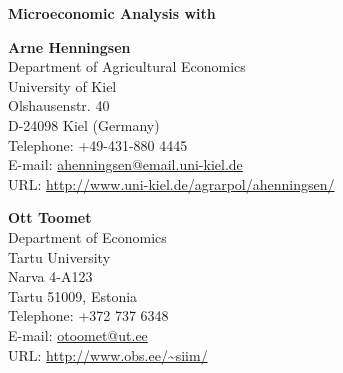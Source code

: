 \documentclass[12pt,english]{article}
\begin{document}
\begin{center}
\vspace*{2cm}
\textbf{\LARGE
Microeconomic Analysis with 
}
\vspace{5em}\\
\parbox[t]{0.49 \textwidth}{\centering
\textbf{Arne Henningsen}\\
Department of Agricultural Economics\\
University of Kiel\\
Olshausenstr. 40\\
D-24098 Kiel (Germany)\\
Telephone: +49-431-880 4445\\
E-mail: \url{ahenningsen@email.uni-kiel.de}\\
URL: \url{http://www.uni-kiel.de/agrarpol/ahenningsen/}
}
\parbox[t]{0.49 \textwidth}{\centering
\textbf{Ott Toomet}\\
Department of Economics\\
Tartu University\\
Narva 4-A123\\
Tartu 51009, Estonia\\
Telephone: +372 737 6348\\
E-mail: \url{otoomet@ut.ee}\\
URL: \url{http://www.obs.ee/~siim/}
}
\vspace{3em}\\
\end{center}













%

\end{document}
